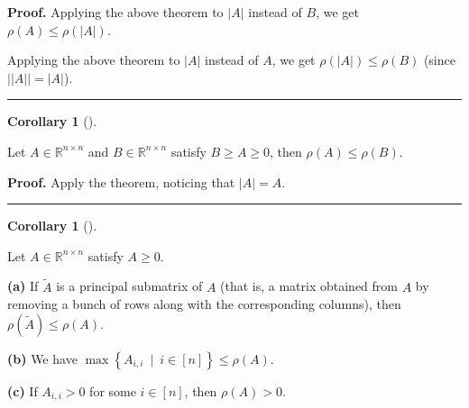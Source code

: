 \documentclass[numbers=enddot,12pt,final,onecolumn,notitlepage]{scrartcl}%
\numberwithin{exer}{subsection}
\theoremstyle{definition}
\newtheorem{coro}[theo]{Corollary}
\newenvironment{corollary}[1][]
{\begin{coro}[#1]\begin{leftbar}}
{\end{leftbar}\end{coro}}
\newenvironment{proof}[1][Proof]{\noindent\textbf{#1.} }{\ \rule{0.5em}{0.5em}}
\begin{document}
\begin{proof}
Applying the above theorem to $\left\vert A\right\vert $ instead of $B$, we
get $\rho\left(  A\right)  \leq\rho\left(  \left\vert A\right\vert \right)  $.

Applying the above theorem to $\left\vert A\right\vert $ instead of $A$, we
get $\rho\left(  \left\vert A\right\vert \right)  \leq\rho\left(  B\right)  $
(since $\left\vert \left\vert A\right\vert \right\vert =\left\vert
A\right\vert $).
\end{proof}

\begin{corollary}
Let $A\in\mathbb{R}^{n\times n}$ and $B\in\mathbb{R}^{n\times n}$ satisfy
$B\geq A\geq0$, then $\rho\left(  A\right)  \leq\rho\left(  B\right)  $.
\end{corollary}

\begin{proof}
Apply the theorem, noticing that $\left\vert A\right\vert =A$.
\end{proof}

\begin{corollary}
Let $A\in\mathbb{R}^{n\times n}$ satisfy $A\geq0$.

\textbf{(a)} If $\widetilde{A}$ is a principal submatrix of $A$ (that is, a
matrix obtained from $A$ by removing a bunch of rows along with the
corresponding columns), then $\rho\left(  \widetilde{A}\right)  \leq
\rho\left(  A\right)  $.

\textbf{(b)} We have $\max\left\{  A_{i,i}\ \mid\ i\in\left[  n\right]
\right\}  \leq\rho\left(  A\right)  $.

\textbf{(c)} If $A_{i,i}>0$ for some $i\in\left[  n\right]  $, then
$\rho\left(  A\right)  >0$.
\end{corollary}
\end{document}
